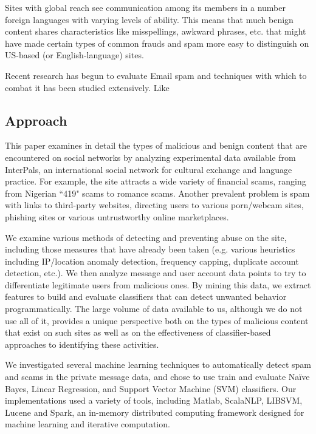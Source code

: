\documentclass[preprint]{acm_proc_article-sp}
\begin{document}
Sites with global reach see communication among its members in a number foreign languages with 
varying levels of ability. This means that much benign content shares characteristics like misspellings, 
awkward phrases, etc. that might have made certain types of common frauds and spam more easy to 
distinguish on US-based (or English-language) sites.

Recent research has begun to evaluate Email spam and techniques with which to combat it has been studied 
extensively. Like




\subsection{Approach}

This paper examines in detail the types of malicious and benign
content that are encountered on social networks by analyzing
experimental data available from InterPals, an international social network
for cultural exchange and language practice. For example, the site
attracts a wide variety of financial scams, ranging from Nigerian
``419" scams to romance scams. Another prevalent problem is spam with
links to third-party websites, directing users to various porn/webcam
sites, phishing sites or various untrustworthy online marketplaces.

We examine various methods of detecting and preventing abuse
on the site, including those measures that have already been taken
(e.g. various heuristics including IP/location anomaly detection,
frequency capping, duplicate account detection, etc.). We then analyze 
message and user account data points to try to differentiate legitimate users
from malicious ones. By mining this data, we extract features 
to build and evaluate classifiers that can detect unwanted behavior 
programmatically. The large volume of data available to us, although we do 
not use all of it, provides a unique perspective both on the types of
malicious content that exist on such sites as well as on the
effectiveness of classifier-based approaches to identifying
these activities.

We investigated several machine learning techniques to automatically 
detect spam and scams in the private message data, and chose to use 
train and evaluate Na\"ive Bayes, Linear Regression, and 
Support Vector Machine (SVM) classifiers. Our implementations used 
a variety of tools, including Matlab, ScalaNLP, LIBSVM, Lucene and Spark, 
an in-memory distributed computing framework designed for machine 
learning and iterative computation.
\end{document}

